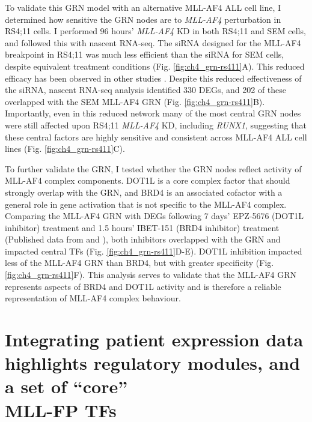 To validate this GRN model with an alternative MLL-AF4 ALL cell line, I determined how sensitive the GRN nodes are to \textit{MLL-AF4} perturbation in RS4;11 cells. I performed 96 hours' \textit{MLL-AF4} KD in both RS4;11 and SEM cells, and followed this with nascent RNA-seq. The siRNA designed for the MLL-AF4 breakpoint in RS4;11 was much less efficient than the siRNA for SEM cells, despite equivalent treatment conditions (Fig. \ref{fig:ch4_grn-rs411}A). This reduced efficacy has been observed in other studies \citep{thomas_targeting_2005, geng_integrative_2012}. Despite this reduced effectiveness of the siRNA, nascent RNA-seq analysis identified 330 DEGs, and 202 of these overlapped with the SEM MLL-AF4 GRN (Fig. \ref{fig:ch4_grn-rs411}B). Importantly, even in this reduced network many of the most central GRN nodes were still affected upon RS4;11 \textit{MLL-AF4} KD, including \textit{RUNX1}, suggesting that these central factors are highly sensitive and consistent across MLL-AF4 ALL cell lines (Fig. \ref{fig:ch4_grn-rs411}C). 

To further validate the GRN, I tested whether the GRN nodes reflect activity of MLL-AF4 complex components. DOT1L is a core complex factor \citep{bernt_mll-rearranged_2011, biswas_function_2011, lacoste_disruptor_2002, milne_leukemogenic_2005, okada_hdot1l_2005, mueller_role_2007, slany_mll_2020, lin_instructive_2016, krivtsov_h3k79_2008} that should strongly overlap with the GRN, and BRD4 is an associated cofactor with a general role in gene activation \citep{dawson_inhibition_2011, zuber_rnai_2011} that is not specific to the MLL-AF4 complex. Comparing the MLL-AF4 GRN with DEGs following 7 days’ EPZ-5676 (DOT1L inhibitor) treatment and 1.5 hours’ IBET-151 (BRD4 inhibitor) treatment (Published data from \cite{godfrey_dot1l_2019} and \cite{crump_bet_2021}), both inhibitors overlapped with the GRN and impacted central TFs (Fig. \ref{fig:ch4_grn-rs411}D-E). DOT1L inhibition impacted less of the MLL-AF4 GRN than BRD4, but with greater specificity (Fig. \ref{fig:ch4_grn-rs411}F). This analysis serves to validate that the MLL-AF4 GRN represents aspects of BRD4 and DOT1L activity and is therefore a reliable representation of MLL-AF4 complex behaviour.

\section[Integrating patient expression data highlights regulatory modules, and a set of “core” MLL-FP TFs]{\label{ch4:patient}Integrating patient expression data highlights regulatory modules, and a set of “core”\\MLL-FP TFs}

